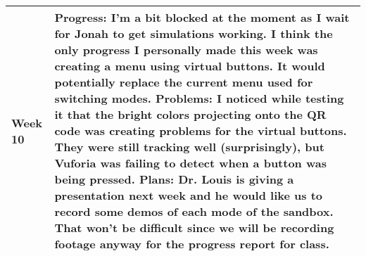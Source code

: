 \documentclass[letterpaper, 10pt, onecolumn, draftclsnofoot]{IEEEtran}
\begin{document}
\begin{center}
\begin{longtable}{|p{4cm}|p{10cm}|}
            \hline
            Week 10 & \textbf{Progress:} I'm a bit blocked at the moment as I wait for Jonah to get simulations working. I think the only progress I personally made this week was creating a menu using virtual buttons. It would potentially replace the current menu used for switching modes. 
            \textbf{Problems:} I noticed while testing it that the bright colors projecting onto the QR code was creating problems for the virtual buttons. They were still tracking well (surprisingly), but Vuforia was failing to detect when a button was being pressed.
            \textbf{Plans:} Dr. Louis is giving a presentation next week and he would like us to record some demos of each mode of the sandbox. That won't be difficult since we will be recording footage anyway for the progress report for class. \\
            \hline
        \end{longtable}
        \end{center}
        
\end{document}

